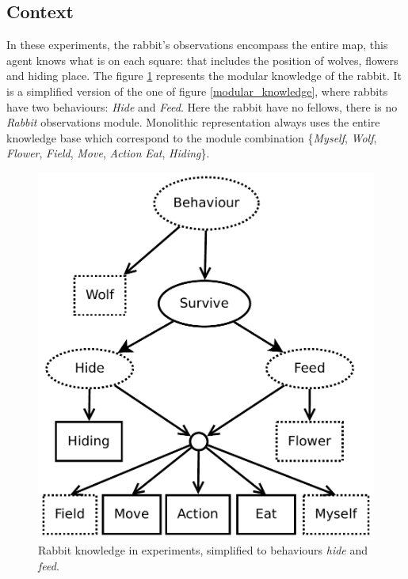\documentclass{aamas2012}
\begin{document}
\subsection{Context}
	
	In these experiments, the rabbit's observations encompass the entire map, 
	this agent knows what is on each square: that includes the position of wolves, flowers and hiding place.
	The figure \ref{modular_knowledge_experiment} represents the modular knowledge of the rabbit.
	It is a simplified version of the one of figure \ref{modular_knowledge}, where rabbits have two behaviours: \emph{Hide} and \emph{Feed}.
	Here the rabbit have no fellows, there is no \emph{Rabbit} observations module.
	Monolithic representation always uses the entire knowledge base which correspond to the module combination
	\{\emph{Myself}, \emph{Wolf}, \emph{Flower}, \emph{Field}, \emph{Move}, \emph{Action} \emph{Eat}, \emph{Hiding}\}.
	
	\begin{figure}
		\centering
		\includegraphics[keepaspectratio=true, scale=0.4]{modular_knowledge_experiment.pdf}
		\caption
		{
			\label{modular_knowledge_experiment}
			Rabbit knowledge in experiments, simplified to behaviours \emph{hide} and \emph{feed}.
		}
	\end{figure}
	
\end{document}
